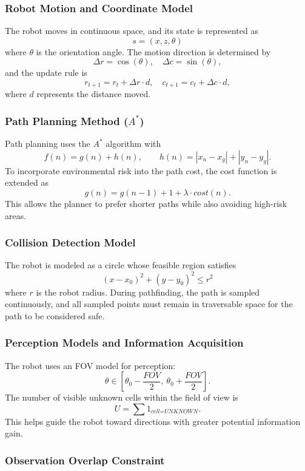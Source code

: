 \documentclass[12pt]{interim_report}
\begin{document}
\subsubsection{Robot Motion and Coordinate Model}

The robot moves in continuous space, and its state is represented as
\[
s = (x, z, \theta)
\]
where \(\theta\) is the orientation angle. The motion direction is determined by
\[
\Delta r = \cos(\theta), \quad \Delta c = \sin(\theta),
\]
and the update rule is
\[
r_{t+1} = r_t + \Delta r \cdot d, \quad c_{t+1} = c_t + \Delta c \cdot d,
\]
where \(d\) represents the distance moved.

\subsubsection{Path Planning Method (\(A^*\))}

Path planning uses the \(A^*\) algorithm with
\[
f(n) = g(n) + h(n), \qquad h(n) = |x_n - x_g| + |y_n - y_g|.
\]
To incorporate environmental risk into the path cost, the cost function is extended as
\[
g(n) = g(n-1) + 1 + \lambda \cdot cost(n).
\]
This allows the planner to prefer shorter paths while also avoiding high-risk areas.

\subsubsection{Collision Detection Model}

The robot is modeled as a circle whose feasible region satisfies
\[
(x - x_0)^2 + (y - y_0)^2 \le r^2
\]
where \(r\) is the robot radius. During pathfinding, the path is sampled continuously, and all sampled points must remain in traversable space for the path to be considered safe.

\subsubsection{Perception Models and Information Acquisition}

The robot uses an FOV model for perception:
\[
\theta \in \left[ \theta_0 - \frac{\textit{FOV}}{2},\ \theta_0 + \frac{\textit{FOV}}{2} \right].
\]
The number of visible unknown cells within the field of view is
\[
U = \sum 1_{\textit{cell} = \textit{UNKNOWN}}.
\]
This helps guide the robot toward directions with greater potential information gain.

\subsubsection{Observation Overlap Constraint}
\end{document}
